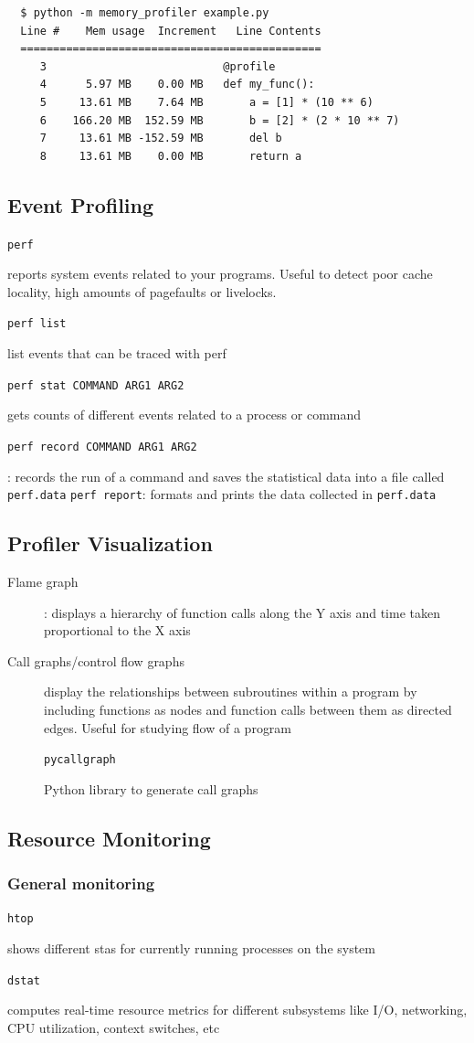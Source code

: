 \documentclass[letterpaper,12pt]{article}
\newcommand*{\lstitem}[1]{
  \setbox0\hbox{\lstinline{#1}}
  \item[\usebox0]
}
\begin{document}
\begin{lstlisting}
  $ python -m memory_profiler example.py
  Line #    Mem usage  Increment   Line Contents
  ==============================================
     3                           @profile
     4      5.97 MB    0.00 MB   def my_func():
     5     13.61 MB    7.64 MB       a = [1] * (10 ** 6)
     6    166.20 MB  152.59 MB       b = [2] * (2 * 10 ** 7)
     7     13.61 MB -152.59 MB       del b
     8     13.61 MB    0.00 MB       return a
\end{lstlisting}

\subsection{Event Profiling}
\begin{description}
 \lstitem{perf} reports system events related to your programs. Useful to detect poor cache locality, high amounts of pagefaults or livelocks.
 \lstitem{perf list} list events that can be traced with perf
 \lstitem{perf stat COMMAND ARG1 ARG2} gets counts of different events related to a process or command
 \lstitem{perf record COMMAND ARG1 ARG2}: records the run of a command and saves the statistical data into a file called \lstinline{perf.data}
 \lstinline{perf report}: formats and prints the data collected in \lstinline{perf.data}
\end{description}

\subsection{Profiler Visualization}
\begin{description}
 \item[Flame graph]: displays a hierarchy of function calls along the Y axis and time taken proportional to the X axis
 \item[Call graphs/control flow graphs] display the relationships between subroutines within a program by including functions as nodes and function calls between them as directed edges. Useful for studying flow of a program
       \lstitem{pycallgraph} Python library to generate call graphs
\end{description}

\subsection{Resource Monitoring}
\subsubsection{General monitoring}
\begin{description}
 \lstitem{htop} shows different stas for currently running processes on the system
 \lstitem{dstat} computes real-time resource metrics for different subsystems like I/O, networking, CPU utilization, context switches, etc
\end{description}
\end{document}
